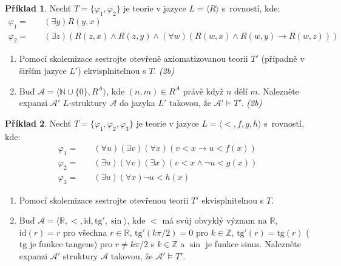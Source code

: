 \documentclass[a4paper]{article}
\theoremstyle{definition}
\newtheorem{problem}{Příklad}
\begin{document}
\medskip\begin{problem}
Nechť $T=\{\varphi_1,\varphi_2\}$ je teorie v jazyce $L=\langle R\rangle$ s~rovností, kde:
\begin{align*}
\varphi_1=&\quad (\exists y)R(y,x)\\
\varphi_2=&\quad (\exists z)(R(z,x)\wedge R(z,y)\wedge (\forall w)(R(w,x) \wedge R(w,y)\to R(w,z)))
\end{align*}
\begin{enumerate}
\item Pomocí skolemizace sestrojte otevřeně axiomatizovanou teorii $T'$ (případně v širším jazyce $L'$) ekvisplnitelnou s $T$. {\it (2b)} 
\item Buď $\mathcal{A}=\langle\mathbb{N}\cup\{0\},R^A\rangle$, kde $(n,m)\in R^A$ právě když $n$ dělí $m$.  Nalezněte expanzi $\mathcal{A}'$ $L$-struktury $\mathcal{A}$ do jazyka $L'$ takovou, že $\mathcal{A}'\models T'$. {\it (2b)}
\end{enumerate}
\end{problem}


\medskip\begin{problem}
Nechť $T=\{\varphi_1,\varphi_2,\varphi_3\}$ je teorie v jazyce $L=\langle<,f,g,h\rangle$ s~rovností, kde:
\begin{align*}
    \varphi_1=&\quad (\forall u)(\exists v)(\forall x)(v<x \to u<f(x))\\
    \varphi_2=&\quad (\exists u)(\forall v)(\exists x)(v<x \wedge \neg u<g(x))\\
    \varphi_3=&\quad (\exists u)(\forall x)\neg u<h(x)
\end{align*}
\begin{enumerate}
    \item Pomocí skolemizace sestrojte otevřenou teorii $T'$ ekvisplnitelnou s $T$.
    \item Buď $\mathcal{A}=\langle\mathbb{R},<,\mathrm{id},\mathrm{tg}',\sin\rangle$, kde $<$ má svůj obvyklý význam na $\mathbb{R}$, $\mathrm{id}(r)=r$ pro všechna $r\in\mathbb{R}$, $\mathrm{tg}'(k\pi/2)=0$ pro $k\in\mathbb{Z}$, $\mathrm{tg}'(r)=\mathrm{tg}(r)$ ($\mathrm{tg}$ je funkce tangens) pro $r\neq k\pi/2$ s $k\in\mathbb{Z}$ a $\sin$ je funkce sinus. Nalezněte expanzi $\mathcal{A}'$ struktury $\mathcal{A}$ takovou, že $\mathcal{A}'\models T'$.
\end{enumerate}
\end{problem}
\end{document}

